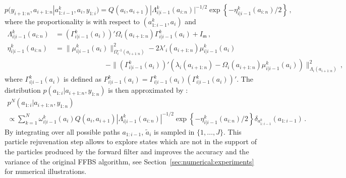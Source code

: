 \documentclass[nolayout]{article}
\theoremstyle{plain}
\theoremstyle{definition}
\newcommand{\1}{\mathbbm{1}}
\def\dimz{\mathsf{m}}
\def\eqsp{\,}
\begin{document}
\begin{equation}
\label{eq:posterior:FFBS}
p(y_{i+1:n},a_{i+1:n}|a^k_{1:i-1},a_i,y_{1:i}) = Q(a_i,a_{i+1})|\Lambda^k_{i|i-1}(a_{i:n})|^{-1/2}\exp\left\{-\eta^k_{i|i-1}(a_{i:n})/2\right\}\eqsp,
\end{equation}
where the proportionality is with respect to $(a^k_{1:i-1},a_i)$ and
\begin{align*}
\Lambda^k_{i|i-1}(a_{i:n})&= (\Gamma_{i|i-1}^k(a_i))'\Omega_i(a_{i+1:n})\Gamma_{i|i-1}^k(a_i) + I_{\dimz}\eqsp,\\
\eta^k_{i|i-1}(a_{i:n}) &= \|\mu_{i|i-1}^k(a_i)\|^2_{\Omega^{-1}_i(a_{i+1:n})} - 2\lambda'_i(a_{i+1:n})\mu_{i|i-1}^k(a_i)\\
&\hspace{3cm}-\|(\Gamma_{i|i-1}^k(a_i))'(\lambda_i(a_{i+1:n})-\Omega_i(a_{i+1:n})\mu_{i|i-1}^k(a_i))\|^2_{\Lambda_i(a_{i+1:n})}\eqsp,
\end{align*}
where $\Gamma_{i|i-1}^k(a_i)$ is defined as $P_{i|i-1}^k(a_i) = \Gamma_{i|i-1}^k(a_i)(\Gamma_{i|i-1}^k(a_i))'$. The distribution $p(a_{1:i}|a_{i+1:n},y_{1:n})$ is then approximated by :
\begin{multline}
\label{eq:FFBS:rejuv}
p^N(a_{1:i}|a_{i+1:n},y_{1:n})\\
\propto\sum_{k=1}^N \omega_{i|i-1}^k(a_i)Q(a_i,a_{i+1})|\Lambda^k_{i|i-1}(a_{i:n})|^{-1/2}\exp\left\{-\eta^k_{i|i-1}(a_{i:n})/2\right\}\delta_{a^k_{1:i-1}}(a_{1:i-1})\eqsp.
\end{multline}
By integrating over all possible paths $a_{1:i-1}$, $\tilde{a}_i$ is sampled in $\{1,\ldots,J\}$. This particle rejuvenation step allows to explore states which are not in the support of the particles produced by the forward filter  and improves the accuracy and the variance of the original FFBS algorithm, see Section~\ref{sec:numerical:experiments} for numerical illustrations. 
\end{document}
